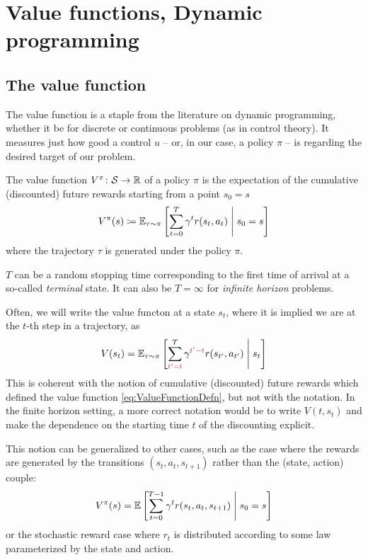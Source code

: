 \documentclass[../course-notes.tex]{subfiles}
\begin{document}
\chapter{Value functions, Dynamic programming}\label{chap:DP}


\section{The value function}

The value function is a staple from the literature on dynamic programming, whether it be for discrete or continuous problems (as in control theory). It measures just how good a control $u$ -- or, in our case, a policy $\pi$ -- is regarding the desired target of our problem.


\begin{defn}
	The value function $V^\pi\colon \mathcal{S} \to \mathbb{R}$ of a policy $\pi$ is the expectation of the cumulative (discounted) future rewards starting from a point $s_0 = s$
	\begin{equation}\label{eq:ValueFunctionDefn}
	V^\pi(s) \coloneqq
	\operatorname{\mathbb{E}}_{\tau\sim\pi}\left[
	\sum_{t=0}^T \gamma^t r(s_t, a_t)
	\;\middle|\; s_0 = s
	\right]
	\end{equation}
	where the trajectory $\tau$ is generated under the policy $\pi$.
	
	$T$ can be a random stopping time corresponding to the first time of arrival at a so-called \emph{terminal} state. It can also be $T = \infty$ for \emph{infinite horizon} problems.
\end{defn}


\begin{remark}
	Often, we will write the value functon at a state $s_t$, where it is implied we are at the $t$-th step in a trajectory, as
	\[
	V(s_t) = \EE_{\tau\sim\pi}\left[
	\sum_{{\redfont t'=t}}^T \gamma^{{\redfont t'-t}} r(s_{t'}, a_{t'})
	\scalemid s_t
	\right]
	\]
	This is coherent with the notion of cumulative (discounted) future rewards which defined the value function \eqref{eq:ValueFunctionDefn}, but not with the notation. In the finite horizon setting, a more correct notation would be to write $V(t, s_t)$ and make the dependence on the starting time $t$ of the discounting explicit.
\end{remark}


This notion can be generalized to other cases, such as the case where the rewards are generated by the transitions $(s_t, a_t, s_{t+1})$ rather than the (state, action) couple:
\[
V^\pi(s) = \operatorname{\mathbb{E}}\left[
\sum_{t=0}^{T-1} \gamma^t r(s_t, a_t, s_{t+1})
\;\middle|\; s_0 = s
\right]
\]
or the stochastic reward case where $r_t$ is distributed according to some law parameterized by the state and action.
\end{document}
